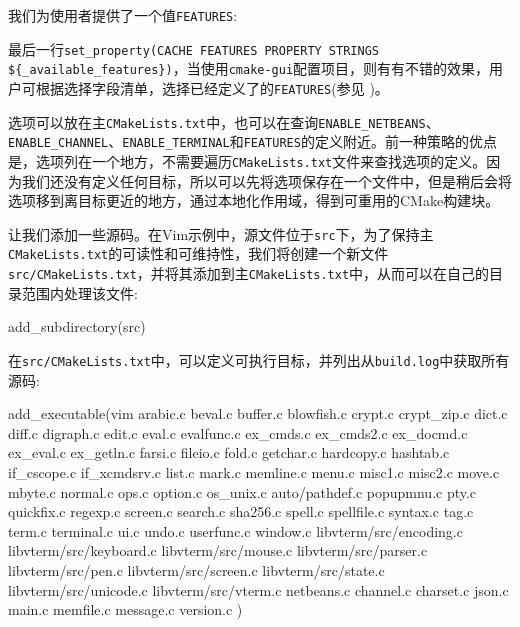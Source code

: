 我们为使用者提供了一个值\texttt{FEATURES}:


最后一行\texttt{set\_property(CACHE FEATURES PROPERTY STRINGS \$\{\_available\_features\})}，当使用\texttt{cmake-gui}配置项目，则有有不错的效果，用户可根据选择字段清单，选择已经定义了的\texttt{FEATURES}(参见 )。

选项可以放在主\texttt{CMakeLists.txt}中，也可以在查询\texttt{ENABLE\_NETBEANS}、\texttt{ENABLE\_CHANNEL}、\texttt{ENABLE\_TERMINAL}和\texttt{FEATURES}的定义附近。前一种策略的优点是，选项列在一个地方，不需要遍历\texttt{CMakeLists.txt}文件来查找选项的定义。因为我们还没有定义任何目标，所以可以先将选项保存在一个文件中，但是稍后会将选项移到离目标更近的地方，通过本地化作用域，得到可重用的CMake构建块。


让我们添加一些源码。在Vim示例中，源文件位于\texttt{src}下，为了保持主\texttt{CMakeLists.txt}的可读性和可维持性，我们将创建一个新文件\texttt{src/CMakeLists.txt}，并将其添加到主\texttt{CMakeLists.txt}中，从而可以在自己的目录范围内处理该文件:

\begin{codebox}[cmake]
add_subdirectory(src)
\end{codebox}

在\texttt{src/CMakeLists.txt}中，可以定义可执行目标，并列出从\texttt{build.log}中获取所有源码:

\begin{codebox}[cmake]
add_executable(vim
  arabic.c beval.c buffer.c blowfish.c crypt.c crypt_zip.c dict.c diff.c digraph.c edit.c eval.c evalfunc.c ex_cmds.c ex_cmds2.c ex_docmd.c ex_eval.c ex_getln.c farsi.c fileio.c fold.c getchar.c hardcopy.c hashtab.c if_cscope.c if_xcmdsrv.c list.c mark.c memline.c menu.c misc1.c misc2.c move.c mbyte.c normal.c ops.c option.c os_unix.c auto/pathdef.c popupmnu.c pty.c quickfix.c regexp.c screen.c search.c sha256.c spell.c spellfile.c syntax.c tag.c term.c terminal.c ui.c undo.c userfunc.c window.c libvterm/src/encoding.c libvterm/src/keyboard.c libvterm/src/mouse.c libvterm/src/parser.c libvterm/src/pen.c libvterm/src/screen.c libvterm/src/state.c libvterm/src/unicode.c libvterm/src/vterm.c netbeans.c channel.c charset.c json.c main.c memfile.c message.c version.c
  )
\end{codebox}

